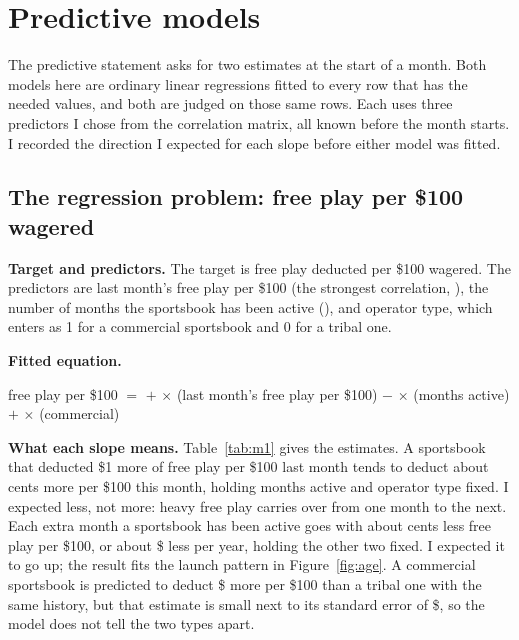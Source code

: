 \section{Predictive models}\label{sec:models}

The predictive statement asks for two estimates at the start of a month. Both models here are ordinary linear regressions fitted to every row that has the needed values, and both are judged on those same rows. Each uses three predictors I chose from the correlation matrix, all known before the month starts. I recorded the direction I expected for each slope before either model was fitted.

\FloatBarrier
\subsection*{The regression problem: free play per \$100 wagered}

\textbf{Target and predictors.} The target is free play deducted per \$100 wagered. The predictors are last month's free play per \$100 (the strongest correlation, ), the number of months the sportsbook has been active (), and operator type, which enters as 1 for a commercial sportsbook and 0 for a tribal one.

\textbf{Fitted equation.}
\begin{center}
free play per \$100 $=$  $+$  $\times$ (last month's free play per \$100) $-$  $\times$ (months active) $+$  $\times$ (commercial)
\end{center}

\begin{table}[!htbp]
\centering\small
\caption{Model 1 estimates ( sportsbook-months). Source: output/tables/model1\_estimates.}\label{tab:m1}

\end{table}

\textbf{What each slope means.} Table~\ref{tab:m1} gives the estimates. A sportsbook that deducted \$1 more of free play per \$100 last month tends to deduct about  cents more per \$100 this month, holding months active and operator type fixed. I expected less, not more: heavy free play carries over from one month to the next. Each extra month a sportsbook has been active goes with about  cents less free play per \$100, or about \$ less per year, holding the other two fixed. I expected it to go up; the result fits the launch pattern in Figure~\ref{fig:age}. A commercial sportsbook is predicted to deduct \$ more per \$100 than a tribal one with the same history, but that estimate is small next to its standard error of \$, so the model does not tell the two types apart.

